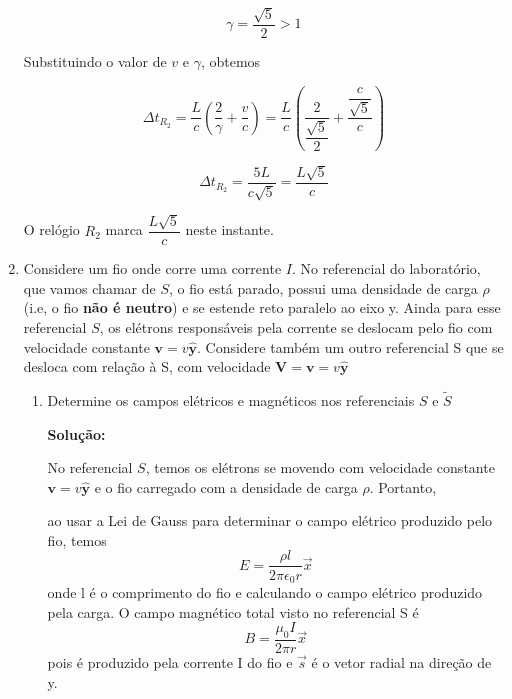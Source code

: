 \documentclass[10pt,a4paper]{article}
\begin{document}
\begin{enumerate}
	\begin{equation*}
		\gamma = \dfrac{\sqrt{5}}{2} > 1
	\end{equation*}
	
	Substituindo o valor de $ v $ e $ \gamma $, obtemos
	
	\begin{equation*}
		\Delta t_{R_2}  = \dfrac{L}{c} (\dfrac{2}{\gamma} + \dfrac{v}{c}) = \dfrac{L}{c} (\dfrac{2}{ \dfrac{\sqrt{5}}{2}} + \dfrac{\dfrac{c}{\sqrt{5}}}{c})
	\end{equation*}

	\begin{equation*}
		\Delta t_{R_2}  = \dfrac{5L}{c\sqrt{5}} = \dfrac{L\sqrt{5}}{c}
	\end{equation*}

	O relógio $ R_2 $ marca $\dfrac{L\sqrt{5}}{c}  $ neste instante.
	
		\item Considere um fio onde corre uma corrente $I$. No referencial do laboratório, que vamos chamar de $S$, o fio está parado, possui uma densidade de carga $\rho$ (i.e, o fio \textbf{não é neutro}) e se estende reto paralelo ao eixo y. Ainda para esse referencial $S$, os elétrons responsáveis pela corrente se deslocam pelo fio com velocidade constante $\mathbf{v} =v \mathbf{\hat{y}}$. Considere também um outro referencial S que se desloca com relação à S, com velocidade $\mathbf{V} = \mathbf{v} = v\mathbf{\hat{y}}$
	\begin{enumerate}
		\item Determine os campos elétricos e magnéticos nos referenciais $S$ e $\tilde{S}$
		
		\textbf{Solução: }
		
		No referencial $ S $, temos os elétrons se movendo com velocidade constante $\mathbf{v} =v \mathbf{\hat{y}}$ e o fio carregado com a densidade de carga $\rho$. Portanto,
		
		ao usar a Lei de Gauss para determinar o campo elétrico produzido pelo fio, temos
		\begin{equation*}
			E = \dfrac{\rho l}{2\pi \epsilon_0r }\vec{x}
		\end{equation*}
		onde l é o comprimento do fio e calculando o campo elétrico produzido pela carga.
		O campo magnético total visto no referencial S é
		\begin{equation*}
			B = \dfrac{\mu_0 I}{2\pi r}\vec{x} 
		\end{equation*}
		pois é produzido pela corrente I do fio e $\vec{s}$ é o vetor radial na direção de y.
		

\end{enumerate}
\end{enumerate}
\end{document}
